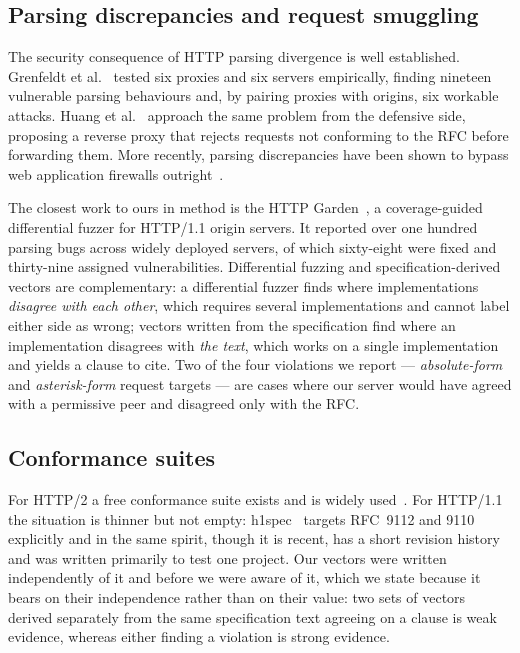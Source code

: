 \documentclass[preprint,12pt]{elsarticle}
\begin{document}
\subsection{Parsing discrepancies and request smuggling}

The security consequence of HTTP parsing divergence is well established. Grenfeldt
et al.~\cite{grenfeldt2021} tested six proxies and six servers empirically,
finding nineteen vulnerable parsing behaviours and, by pairing proxies with
origins, six workable attacks. Huang et al.~\cite{huang2022} approach the same
problem from the defensive side, proposing a reverse proxy that rejects requests
not conforming to the RFC before forwarding them. More recently, parsing
discrepancies have been shown to bypass web application firewalls
outright~\cite{waffled}.

The closest work to ours in method is the HTTP Garden~\cite{httpgarden}, a
coverage-guided differential fuzzer for HTTP/1.1 origin servers. It reported over
one hundred parsing bugs across widely deployed servers, of which sixty-eight
were fixed and thirty-nine assigned vulnerabilities. Differential fuzzing and
specification-derived vectors are complementary: a differential fuzzer finds
where implementations \emph{disagree with each other}, which requires several
implementations and cannot label either side as wrong; vectors written from the
specification find where an implementation disagrees with \emph{the text}, which
works on a single implementation and yields a clause to cite. Two of the four
violations we report --- \emph{absolute-form} and \emph{asterisk-form} request
targets --- are cases where our server would have agreed with a permissive peer
and disagreed only with the RFC.

\subsection{Conformance suites}

For HTTP/2 a free conformance suite exists and is widely used~\cite{h2spec}.
For HTTP/1.1 the situation is thinner but not empty: h1spec~\cite{h1spec}
targets RFC~9112 and 9110 explicitly and in the same spirit, though it is recent,
has a short revision history and was written primarily to test one project. Our
vectors were written independently of it and before we were aware of it, which
we state because it bears on their independence rather than on their value: two
sets of vectors derived separately from the same specification text agreeing on
a clause is weak evidence, whereas either finding a violation is strong
evidence.
\end{document}
